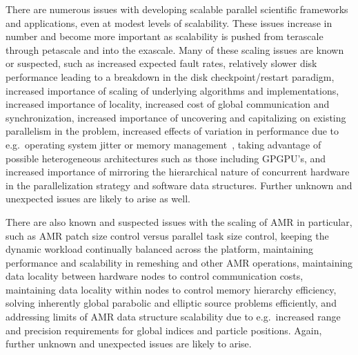 \documentclass[10pt,twocolumn]{article}
\begin{document}
There are numerous issues with developing scalable parallel scientific
frameworks and applications, even at modest levels of scalability.
These issues increase in number and become more important as
scalability is pushed from terascale through petascale and into the
exascale.  Many of these scaling issues are known or suspected, such
as increased expected fault rates, relatively slower disk performance
leading to a breakdown in the disk checkpoint/restart paradigm,
increased importance of scaling of underlying algorithms and
implementations, increased importance of locality, increased cost of
global communication and synchronization, increased importance of
uncovering and capitalizing on existing parallelism in the problem,
increased effects of variation in performance due to e.g.~operating
system jitter or memory management~\cite{StSh09}, taking advantage of
possible heterogeneous architectures such as those including GPGPU's,
and increased importance of mirroring the hierarchical nature of
concurrent hardware in the parallelization strategy and software data
structures.  Further unknown and unexpected issues are likely to arise
as well.

There are also known and suspected issues with the scaling of AMR in
particular, such as AMR patch size control versus parallel task size
control, keeping the dynamic workload continually balanced across the
platform, maintaining performance and scalability in remeshing and
other AMR operations, maintaining data locality between hardware nodes
to control communication costs, maintaining data locality within nodes
to control memory hierarchy efficiency, solving inherently global
parabolic and elliptic source problems efficiently, and addressing
limits of AMR data structure scalability due to e.g.~increased range
and precision requirements for global indices and particle positions.
Again, further unknown and unexpected issues are likely to arise.
\end{document}

